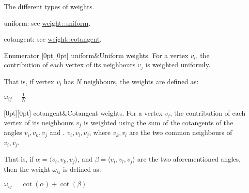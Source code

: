 The different types of weights. 


\begin{DoxyItemize}
\item uniform\+: see \hyperlink{namespacegeoproc_a12e5a10581b53b9dd9a509127527f843aa489ffed938ef1b9e86889bc413501ee}{weight\+::uniform}.
\item cotangent\+: see \hyperlink{namespacegeoproc_a12e5a10581b53b9dd9a509127527f843a8e8ea879f40475ae2c70be8b296bf950}{weight\+::cotangent}. 
\end{DoxyItemize}\begin{DoxyEnumFields}{Enumerator}
[0pt][0pt]{}\mbox{\label{namespacegeoproc_a12e5a10581b53b9dd9a509127527f843aa489ffed938ef1b9e86889bc413501ee}} 
uniform&Uniform weights. For a vertex $v_i$, the contribution of each vertex of its neighbours $v_j$ is weighted uniformly.

That is, if vertex $v_i$ has $N$ neighbours, the weights are defined as\+:

$ \omega_{ij} = \frac{1}{N} $ \\
\hline

[0pt][0pt]{}\mbox{\label{namespacegeoproc_a12e5a10581b53b9dd9a509127527f843a8e8ea879f40475ae2c70be8b296bf950}} 
cotangent&Cotangent weights. For a vertex $v_i$, the contribution of each vertex of its neighbours $v_j$ is weighted using the sum of the cotangents of the angles $ v_i,v_k,v_j $ and . $ v_i,v_l,v_j $, where $ v_k,v_l $ are the two common neighbours of $ v_i,v_j $.

That is, if $ \alpha = \langle v_i,v_k,v_j \rangle $, and $ \beta = \langle v_i,v_l,v_j \rangle $ are the two aforementioned angles, then the weight $ \omega_{ij} $ is defined as\+:

$ \omega_{ij} = \cot(\alpha) + \cot(\beta) $ \\
\hline

\end{DoxyEnumFields}
